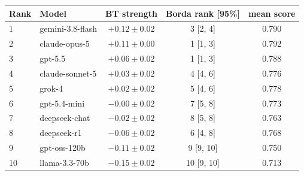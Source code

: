 \begin{tabular}{llccc}
\toprule
Rank & Model & BT strength & Borda rank [95\%] & mean score \\
\midrule
1 & gemini-3.8-flash & $+0.12 \pm 0.02$ & 3 [2, 4] & 0.790 \\
2 & claude-opus-5 & $+0.11 \pm 0.00$ & 1 [1, 3] & 0.792 \\
3 & gpt-5.5 & $+0.06 \pm 0.02$ & 1 [1, 3] & 0.788 \\
4 & claude-sonnet-5 & $+0.03 \pm 0.02$ & 4 [4, 6] & 0.776 \\
5 & grok-4 & $+0.02 \pm 0.02$ & 5 [4, 6] & 0.778 \\
6 & gpt-5.4-mini & $-0.00 \pm 0.02$ & 7 [5, 8] & 0.773 \\
7 & deepseek-chat & $-0.02 \pm 0.02$ & 8 [5, 8] & 0.763 \\
8 & deepseek-r1 & $-0.06 \pm 0.02$ & 6 [4, 8] & 0.768 \\
9 & gpt-oss-120b & $-0.11 \pm 0.02$ & 9 [9, 10] & 0.750 \\
10 & llama-3.3-70b & $-0.15 \pm 0.02$ & 10 [9, 10] & 0.713 \\
\bottomrule
\end{tabular}

